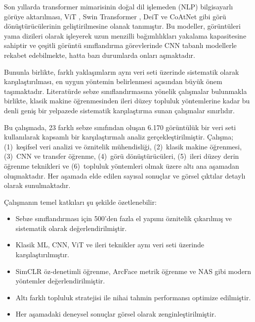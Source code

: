 \documentclass[conference]{IEEEtran}
\begin{document}
Son y{\i}llarda transformer mimarisinin do\u{g}al dil i\c{s}lemeden (NLP) bilgisayarl{\i} g\"{o}r\"{u}ye aktar{\i}lmas{\i}, ViT \cite{dosovitskiy2020image}, Swin Transformer \cite{liu2021swin}, DeiT \cite{touvron2021training} ve CoAtNet \cite{dai2021coatnet} gibi g\"{o}r\"{u} d\"{o}n\"{u}\c{s}t\"{u}r\"{u}c\"{u}lerinin geli\c{s}tirilmesine olanak tan{\i}m{\i}\c{s}t{\i}r. Bu modeller, g\"{o}r\"{u}nt\"{u}leri yama dizileri olarak i\c{s}leyerek uzun menzilli ba\u{g}{\i}ml{\i}l{\i}klar{\i} yakalama kapasitesine sahiptir ve \c{c}e\c{s}itli g\"{o}r\"{u}nt\"{u} s{\i}n{\i}fland{\i}rma g\"{o}revlerinde CNN tabanl{\i} modellerle rekabet edebilmekte, hatta baz{\i} durumlarda onlar{\i} a\c{s}maktad{\i}r.

Bununla birlikte, farkl{\i} yakla\c{s}{\i}mlar{\i}n ayn{\i} veri seti \"{u}zerinde sistematik olarak kar\c{s}{\i}la\c{s}t{\i}r{\i}lmas{\i}, en uygun y\"{o}ntemin belirlenmesi a\c{c}{\i}s{\i}ndan b\"{u}y\"{u}k \"{o}nem ta\c{s}{\i}maktad{\i}r. Literat\"{u}rde sebze s{\i}n{\i}fland{\i}rmas{\i}na y\"{o}nelik \c{c}al{\i}\c{s}malar bulunmakla birlikte, klasik makine \"{o}\u{g}renmesinden ileri d\"{u}zey topluluk y\"{o}ntemlerine kadar bu denli geni\c{s} bir yelpazede sistematik kar\c{s}{\i}la\c{s}t{\i}rma sunan \c{c}al{\i}\c{s}malar s{\i}n{\i}rl{\i}d{\i}r.

Bu \c{c}al{\i}\c{s}mada, 23 farkl{\i} sebze s{\i}n{\i}f{\i}ndan olu\c{s}an 6.170 g\"{o}r\"{u}nt\"{u}l\"{u}k bir veri seti kullan{\i}larak kapsaml{\i} bir kar\c{s}{\i}la\c{s}t{\i}rmal{\i} analiz ger\c{c}ekle\c{s}tirilmi\c{s}tir. \c{C}al{\i}\c{s}ma; (1)~ke\c{s}ifsel veri analizi ve \"{o}znitelik m\"{u}hendisli\u{g}i, (2)~klasik makine \"{o}\u{g}renmesi, (3)~CNN ve transfer \"{o}\u{g}renme, (4)~g\"{o}r\"{u} d\"{o}n\"{u}\c{s}t\"{u}r\"{u}c\"{u}leri, (5)~ileri d\"{u}zey derin \"{o}\u{g}renme teknikleri ve (6)~topluluk y\"{o}ntemleri olmak \"{u}zere alt{\i} ana a\c{s}amadan olu\c{s}maktad{\i}r. Her a\c{s}amada elde edilen say{\i}sal sonu\c{c}lar ve g\"{o}rsel \c{c}{\i}kt{\i}lar detayl{\i} olarak sunulmaktad{\i}r.

\c{C}al{\i}\c{s}man{\i}n temel katk{\i}lar{\i} \c{s}u \c{s}ekilde \"{o}zetlenebilir:
\begin{itemize}
    \item Sebze s{\i}n{\i}fland{\i}rmas{\i} i\c{c}in 500'den fazla el yap{\i}m{\i} \"{o}znitelik \c{c}{\i}kar{\i}lm{\i}\c{s} ve sistematik olarak de\u{g}erlendirilmi\c{s}tir.
    \item Klasik ML, CNN, ViT ve ileri teknikler ayn{\i} veri seti \"{u}zerinde kar\c{s}{\i}la\c{s}t{\i}r{\i}lm{\i}\c{s}t{\i}r.
    \item SimCLR \"{o}z-denetimli \"{o}\u{g}renme, ArcFace metrik \"{o}\u{g}renme ve NAS gibi modern y\"{o}ntemler de\u{g}erlendirilmi\c{s}tir.
    \item Alt{\i} farkl{\i} topluluk stratejisi ile nihai tahmin performans{\i} optimize edilmi\c{s}tir.
    \item Her a\c{s}amadaki deneysel sonu\c{c}lar g\"{o}rsel olarak zenginle\c{s}tirilmi\c{s}tir.
\end{itemize}
\end{document}
